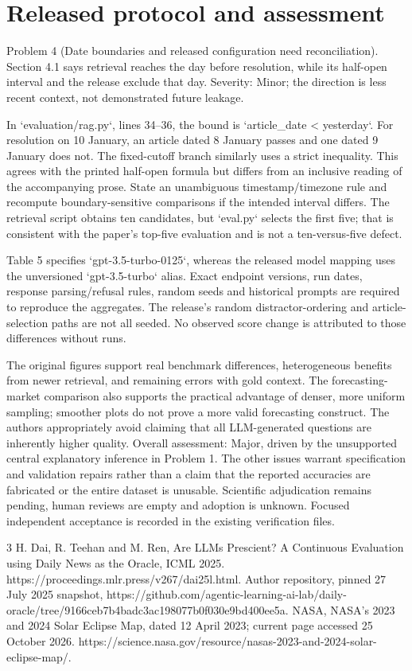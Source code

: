 \documentclass[10pt]{article}
\begin{document}
\section*{Released protocol and assessment}
Problem 4 (Date boundaries and released configuration need reconciliation).  Section 4.1 says retrieval reaches the day before resolution, while its half-open interval and the release exclude that day. Severity: Minor; the direction is less recent context, not demonstrated future leakage.\par
In `evaluation/rag.py`, lines 34–36, the bound is `article\_date < yesterday`. For resolution on 10 January, an article dated 8 January passes and one dated 9 January does not. The fixed-cutoff branch similarly uses a strict inequality. This agrees with the printed half-open formula but differs from an inclusive reading of the accompanying prose. State an unambiguous timestamp/timezone rule and recompute boundary-sensitive comparisons if the intended interval differs. The retrieval script obtains ten candidates, but `eval.py` selects the first five; that is consistent with the paper’s top-five evaluation and is not a ten-versus-five defect.\par
Table 5 specifies `gpt-3.5-turbo-0125`, whereas the released model mapping uses the unversioned `gpt-3.5-turbo` alias. Exact endpoint versions, run dates, response parsing/refusal rules, random seeds and historical prompts are required to reproduce the aggregates. The release’s random distractor-ordering and article-selection paths are not all seeded. No observed score change is attributed to those differences without runs.\par
The original figures support real benchmark differences, heterogeneous benefits from newer retrieval, and remaining errors with gold context. The forecasting-market comparison also supports the practical advantage of denser, more uniform sampling; smoother plots do not prove a more valid forecasting construct. The authors appropriately avoid claiming that all LLM-generated questions are inherently higher quality. Overall assessment: Major, driven by the unsupported central explanatory inference in Problem 1. The other issues warrant specification and validation repairs rather than a claim that the reported accuracies are fabricated or the entire dataset is unusable. Scientific adjudication remains pending, human reviews are empty and adoption is unknown. Focused independent acceptance is recorded in the existing verification files.\par
3 H. Dai, R. Teehan and M. Ren, Are LLMs Prescient? A Continuous Evaluation using Daily News as the Oracle, ICML 2025. https://proceedings.mlr.press/v267/dai25l.html. Author repository, pinned 27 July 2025 snapshot, https://github.com/agentic-learning-ai-lab/daily-oracle/tree/9166ceb7b4badc3ac198077b0f030e9bd400ee5a. NASA, NASA’s 2023 and 2024 Solar Eclipse Map, dated 12 April 2023; current page accessed 25 October 2026. https://science.nasa.gov/resource/nasas-2023-and-2024-solar-eclipse-map/.\par
\end{document}
